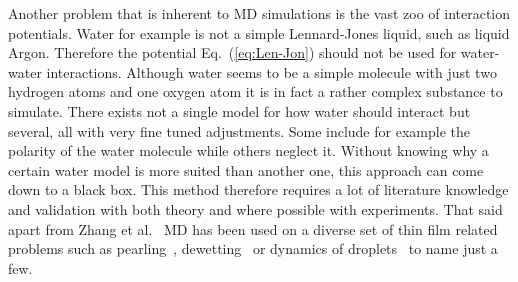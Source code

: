Another problem that is inherent to MD simulations is the vast zoo of interaction potentials.
Water for example is not a simple Lennard-Jones liquid, such as liquid Argon. 
Therefore the potential Eq.~(\ref{eq:Len-Jon}) should not be used for water-water interactions.
Although water seems to be a simple molecule with just two hydrogen atoms and one oxygen atom it is in fact a rather complex substance to simulate.
There exists not a single model for how water should interact but several, all with very fine tuned adjustments.
Some include for example the polarity of the water molecule while others neglect it.
Without knowing why a certain water model is more suited than another one, this approach can come down to a black box.
This method therefore requires a lot of literature knowledge and validation with both theory and where possible with experiments.
That said apart from Zhang et al.~\cite{zhangMolecularSimulationThin2019} MD has been used on a diverse set of thin film related problems such as pearling~\cite{koplikPearlingInstabilityNanoscale2006}, dewetting~\cite{bertrandDynamicsDewettingNanoscale2007} or dynamics of droplets~\cite{liuActuatingWaterDroplets2015, wangMolecularDynamicsSimulations2015} to name just a few.

